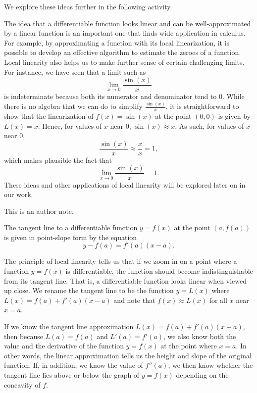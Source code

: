 We explore these ideas further in the following activity.



The idea that a differentiable function looks linear and can be well-approximated by a linear function is an important one that finds wide application in calculus.  For example, by approximating a function with its local linearization, it is possible to develop an effective algorithm to estimate the zeroes of a function.  Local linearity also helps us to make further sense of certain challenging limits.  For instance, we have seen that a limit such as
$$\lim_{x \to 0} \frac{\sin(x)}{x}$$
is indeterminate because both its numerator and denominator tend to 0.  While there is no algebra that we can do to simplify $\frac{\sin(x)}{x}$, it is straightforward to show that the linearization of $f(x) = \sin(x)$ at the point $(0,0)$ is given by $L(x) = x$.  Hence, for values of $x$ near 0, $\sin(x) \approx x$.  As such, for values of $x$ near 0, 
$$\frac{\sin(x)}{x} \approx \frac{x}{x} = 1,$$
which makes plausible the fact that $$\lim_{x \to 0} \frac{\sin(x)}{x} = 1.$$
These ideas and other applications of local linearity will be explored later on in our work.

%

\begin{authornote}
This is an author note.
\end{authornote}

\begin{summary}
\item The tangent line to a differentiable function $y = f(x)$ at the point $(a,f(a))$ is given in point-slope form by the equation
$$y - f(a) = f'(a)(x-a).$$
\item The principle of local linearity tells us that if we zoom in on a point where a function $y = f(x)$ is differentiable, the function should become indistinguishable from its tangent line.  That is, a differentiable function looks linear when viewed up close.  We rename the tangent line to be the function $y = L(x)$ where $L(x) = f(a) + f'(a)(x-a)$ and note that $f(x) \approx L(x)$ for all $x$ near $x = a$.
\item If we know the tangent line approximation $L(x) = f(a) + f'(a)(x-a)$, then because $L(a) = f(a)$ and $L'(a) = f'(a)$, we also know both the value and the derivative of the function $y = f(x)$ at the point where $x = a$.  In other words, the linear approximation tells us the height and slope of the original function.  If, in addition, we know the value of $f''(a)$, we then know whether the tangent line lies above or below the graph of $y = f(x)$ depending on the concavity of $f$.
\end{summary}

\nin \hrulefill

 

\clearpage

